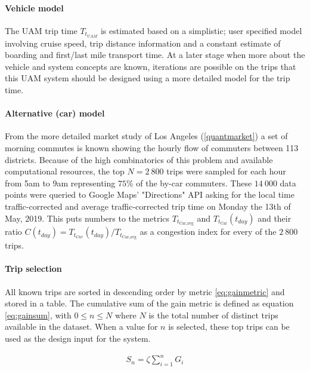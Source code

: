 \paragraph{Vehicle model}

The UAM trip time $T_{{t}_{UAM}}$ is estimated based on a simplistic; user specified model involving cruise speed, trip distance information and a constant estimate of boarding and first/last mile transport time. At a later stage when more about the vehicle and system concepts are known, iterations are possible on the trips that this UAM system should be designed using a more detailed model for the trip time.


\paragraph{Alternative (car) model}

From the more detailed market study of Los Angeles (\autoref{quantmarket}) a set of morning commutes is known showing the hourly flow of commuters between 113 districts. Because of the high combinatorics of this problem and available computational resources, the top $N = 2\ 800$ trips were sampled for each hour from 5am to 9am representing $75\%$ of the by-car commuters. These $14\ 000$ data points were queried to Google Maps' "Directions" API asking for the local time traffic-corrected and average traffic-corrected trip time on Monday the 13th of May, 2019. This puts numbers to the metrics $T_{t_\text{Car,avg}}$ and $T_{t_{\text{Car} }}(t_{day})$ and their ratio $C(t_{day}) = T_{t_{Car}}(t_{day}) / T_{t_\text{Car,avg}}$ as a congestion index for every of the $2\ 800$ trips.



\paragraph{Trip selection}

All known trips are sorted in descending order by metric \ref{eq:gainmetric} and stored in a table. The cumulative sum of the gain metric is defined as equation \ref{eq:gainsum}, with $0\leq n\leq N$ where $N$ is the total number of distinct trips available in the dataset. When a value for $n$ is selected, these top trips can be used as the design input for the system.

\begin{align} \label{eq:gainsum}
    S_n = \zeta \sum_{i=1}^{n}{G_i}
\end{align}

